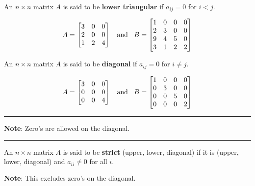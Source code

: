 %
\begin{definition}
 An $n \times n$ matrix $A$ is said to be \textbf{lower triangular} if $a_{ij} = 0$ for $i<j$.  
\end{definition}
\begin{example}
\[ A = \begin{bmatrix}  3 &  0  & 0\\ 2 & 0  &  0 \\  1 &  2 &  4   \end{bmatrix}   \text{\;\; and \;\;} B = \begin{bmatrix}  1 &  0  & 0 &  0\\ 2 & 3  &  0  &  0 \\  9 &  4 &  5 &  0 \\ 3  &  1   &   2   & 2  \end{bmatrix}  \]
\end{example}







%
\begin{definition}
 An $n \times n$ matrix $A$ is said to be \textbf{diagonal} if $a_{ij} = 0$ for $i \ne j$.  
\end{definition}

\begin{example}
\[ A = \begin{bmatrix}  3 &  0  & 0\\ 0 & 0  &  0 \\  0 &  0 &  4   \end{bmatrix}   \text{\;\; and \;\;} B = \begin{bmatrix}  1 &  0  & 0 &  0\\ 0 & 3  &  0  &  0 \\  0 &  0 &  5 &  0 \\ 0  &  0   &   0   & 2  \end{bmatrix}  \]
\end{example}

\rule[0.01in]{\textwidth}{0.0025in}

\textbf{Note}:  Zero's are allowed on the diagonal.  


\rule[0.01in]{\textwidth}{0.0025in}





%
\begin{definition}
 An $n \times n$ matrix $A$ is said to be \textbf{strict} (upper, lower, diagonal) if it is (upper, lower, diagonal) and $a_{ii} \ne 0$ for all $i$.
 
 \textbf{Note}:  This excludes zero's on the diagonal.   
\end{definition}



